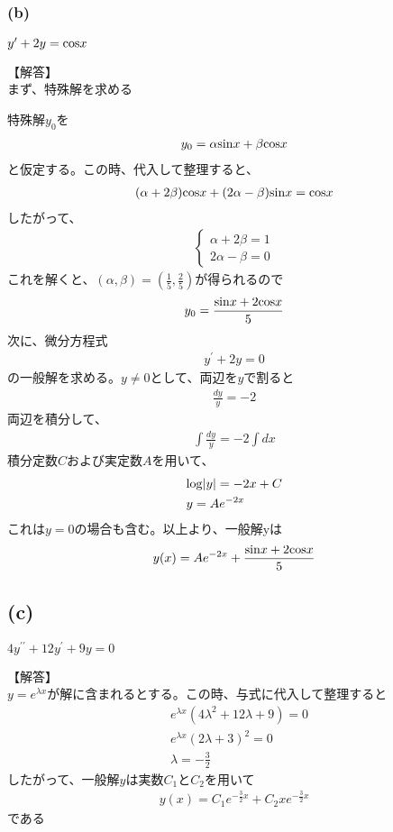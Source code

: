 \documentclass[pdflatex,ja=standard,fleqn]{bxjsarticle}
\begin{document}
\subsubsection*{(b)}
\begin{screen}
    $y^{\prime}+2y={\rm cos}x$ 
\end{screen}
【解答】\\
まず、特殊解を求める\par
特殊解$y_{0}$を
\begin{eqnarray*}y_{0}=\alpha{\rm sin}x+\beta{\rm cos}x\end{eqnarray*}
と仮定する。この時、代入して整理すると、
\begin{eqnarray*}(\alpha+2\beta){\rm cos}x+(2\alpha-\beta){\rm sin}x={\rm cos}x\end{eqnarray*}
したがって、
\begin{eqnarray*}
    \begin{cases} 
        \alpha+2\beta=1 \\ 
        2\alpha-\beta=0
    \end{cases}
\end{eqnarray*}
これを解くと、$(\alpha,\beta)=(\frac{1}{5},\frac{2}{5})$が得られるので
\begin{eqnarray*}y_{0}=\frac{{\rm sin}x+2{\rm cos}x}{5}\end{eqnarray*}
次に、微分方程式
\begin{eqnarray*}y^{\prime}+2y=0\end{eqnarray*}
の一般解を求める。$y\ne0$として、両辺を$y$で割ると
\begin{eqnarray*}\frac{dy}{y}=-2\end{eqnarray*}
両辺を積分して、
\begin{eqnarray*}\int \frac{dy}{y}=-2\int dx\end{eqnarray*}
積分定数$C$および実定数$A$を用いて、
\begin{align*}
    &{\rm log}|y|=-2x+C\\
    &y=Ae^{-2x}\end{align*}
これは$y=0$の場合も含む。以上より、一般解yは
\begin{eqnarray*}y(x)=Ae^{-2x}+\frac{{\rm sin}x+2{\rm cos}x}{5}\end{eqnarray*}

\subsection*{(c)}
\begin{screen}
    $4y^{\prime\prime}+12y^{\prime}+9y=0$ 
\end{screen}
【解答】\\
$y=e^{\lambda x}$が解に含まれるとする。この時、与式に代入して整理すると
\begin{align*}
    &e^{\lambda x}(4\lambda^2+12\lambda+9)=0\\
    &e^{\lambda x}(2\lambda+3)^2=0\\
    &\lambda=-\frac{3}{2}
\end{align*}
したがって、一般解$y$は実数$C_{1}$と$C_{2}$を用いて
\begin{eqnarray*}y(x)=C_{1}e^{-\frac{3}{2}x}+C_{2}xe^{-\frac{3}{2}x}\end{eqnarray*}
である
\end{document}
